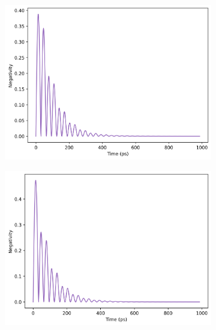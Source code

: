 \documentclass[11pt]{article}
\begin{document}
\begin{figure}[H] 
    \centering
    \begin{subfigure}{0.45\textwidth}
        \centering
        \includegraphics[width=\linewidth]{Research Project/Code/results/JCM/OQS_Neg_Spont.png}
        \caption{}
        \label{fig:JCM_OQS_Neg_Spont}
    \end{subfigure}
    \hfill
    \begin{subfigure}{0.45\textwidth}
        \centering
        \includegraphics[width=\linewidth]{Research Project/Code/results/JCM/OQS_Neg_Therm.png}
        \caption{}
        \label{fig:JCM_OQS_Neg_Therm}
    \end{subfigure}
    

\end{figure}
\end{document}
